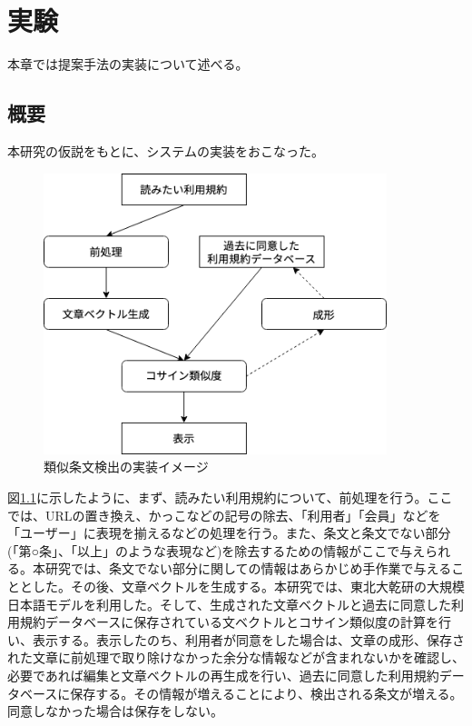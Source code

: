 \chapter{実験}
\label{experiment}

本章では提案手法の実装について述べる。

\section{概要}
\label{sub:実験概要}
本研究の仮説をもとに、システムの実装をおこなった。
\begin{figure}[h]
  \begin{center}
      \includegraphics[width=10cm]{img/system.drawio.png}
      \caption{類似条文検出の実装イメージ}
      \label{img:類似条文検出の実装イメージ}
  \end{center}
\end{figure}
図\ref{img:類似条文検出の実装イメージ}に示したように、まず、読みたい利用規約について、前処理を行う。ここでは、URLの置き換え、かっこなどの記号の除去、「利用者」「会員」などを「ユーザー」に表現を揃えるなどの処理を行う。また、条文と条文でない部分(「第○条」、「以上」のような表現など)を除去するための情報がここで与えられる。本研究では、条文でない部分に関しての情報はあらかじめ手作業で与えることとした。その後、文章ベクトルを生成する。本研究では、東北大乾研の大規模日本語モデルを利用した。そして、生成された文章ベクトルと過去に同意した利用規約データベースに保存されている文ベクトルとコサイン類似度の計算を行い、表示する。表示したのち、利用者が同意をした場合は、文章の成形、保存された文章に前処理で取り除けなかった余分な情報などが含まれないかを確認し、必要であれば編集と文章ベクトルの再生成を行い、過去に同意した利用規約データベースに保存する。その情報が増えることにより、検出される条文が増える。同意しなかった場合は保存をしない。

